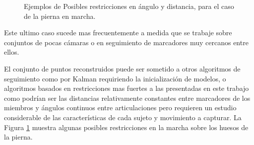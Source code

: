 \begin{figure}[ht!]
\caption{Ejemplos de Posibles restricciones en ángulo y distancia, para el caso de la pierna en marcha.}
\label{restricciones_tracking}
\end{figure}

Este ultimo caso sucede mas frecuentemente a medida que se trabaje sobre conjuntos de pocas cámaras o en seguimiento de marcadores muy cercanos entre ellos. 

El conjunto de puntos reconstruidos puede ser sometido a otros algoritmos de seguimiento como por Kalman \cite{kalman} requiriendo la inicialización de modelos, o algoritmos basados en restricciones mas fuertes a las presentadas en este trabajo como podrían ser las distancias relativamente constantes entre marcadores de los miembros y ángulos continuos entre articulaciones pero requieren un estudio considerable de las características de cada sujeto y movimiento a capturar. La Figura \ref{restricciones_tracking} muestra algunas posibles restricciones en la marcha sobre los huesos de la pierna.

